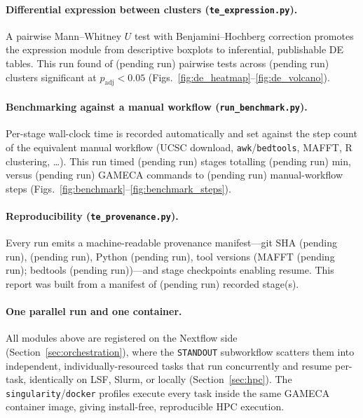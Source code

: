 \documentclass[11pt]{article}
\providecommand{\provGitSha}{(pending run)}\providecommand{\provPlatform}{(pending run)}
\providecommand{\provPython}{(pending run)}\providecommand{\provNStages}{(pending run)}
\providecommand{\provMafftVer}{(pending run)}\providecommand{\provBedtoolsVer}{(pending run)}
\providecommand{\deNClusters}{(pending run)}\providecommand{\deNTests}{(pending run)}
\providecommand{\benchGAMECAsteps}{(pending run)}\providecommand{\benchManualSteps}{(pending run)}
\providecommand{\benchNStages}{(pending run)}\providecommand{\benchTotalSec}{(pending run)}
\providecommand{\benchTotalMin}{(pending run)}
\begin{document}
\paragraph{Differential expression between clusters (\texttt{te\_expression.py}).}
A pairwise Mann--Whitney $U$ test with Benjamini--Hochberg correction promotes the
expression module from descriptive boxplots to inferential, publishable DE tables. This run
found \deNSignificant{} of \deNTests{} pairwise tests across \deNClusters{} clusters
significant at $p_\mathrm{adj}<0.05$ (Figs.~\ref{fig:de_heatmap}--\ref{fig:de_volcano}).

\paragraph{Benchmarking against a manual workflow (\texttt{run\_benchmark.py}).}
Per-stage wall-clock time is recorded automatically and set against the step count of the
equivalent manual workflow (UCSC download, \texttt{awk}/\texttt{bedtools}, MAFFT, R
clustering, \dots). This run timed \benchNStages{} stages totalling \benchTotalMin{} min,
versus \benchGAMECAsteps{} GAMECA commands to \benchManualSteps{} manual-workflow steps
(Figs.~\ref{fig:benchmark}--\ref{fig:benchmark_steps}).

\paragraph{Reproducibility (\texttt{te\_provenance.py}).}
Every run emits a machine-readable provenance manifest---git SHA \provGitSha,
\provPlatform, Python \provPython, tool versions (MAFFT \provMafftVer; bedtools
\provBedtoolsVer)---and stage checkpoints enabling resume. This report was built
from a manifest of \provNStages{} recorded stage(s).

\paragraph{One parallel run and one container.}
\label{sec:pipeline-dag}
All modules above are registered on the Nextflow side (Section~\ref{sec:orchestration}), where
the \texttt{STANDOUT} subworkflow scatters them into independent, individually-resourced tasks
that run concurrently and resume per-task, identically on LSF, Slurm, or locally
(Section~\ref{sec:hpc}). The \texttt{singularity}/\texttt{docker} profiles execute every task
inside the same GAMECA container image, giving install-free, reproducible HPC execution.
\end{document}
